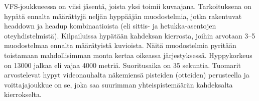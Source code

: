 VFS-joukkueessa on viisi jäsentä, joista yksi toimii kuvaajana. Tarkoituksena on hypätä ennalta määrättyjä neljän hyppääjän muodostelmia, jotka rakentuvat headdown ja headup kombinaatioista (eli sittis- ja hetukka-asentojen oteyhdistelmistä). Kilpailuissa hypätään kahdeksan kierrosta, joihin arvotaan 3–5 muodostelmaa ennalta määrätyistä kuvioista. Näitä muodostelmia pyritään toistamaan mahdollisimman monta kertaa oikeassa järjestyksessä. Hyppykorkeus on 13000 jalkaa eli vajaa 4000 metriä. Suoritusaika on 35 sekuntia. Tuomarit arvostelevat hypyt videonauhalta näkemiensä pisteiden (otteiden) perusteella ja voittajajoukkue on se, joka saa suurimman yhteispistemäärän kahdeksalta kierrokselta. 

